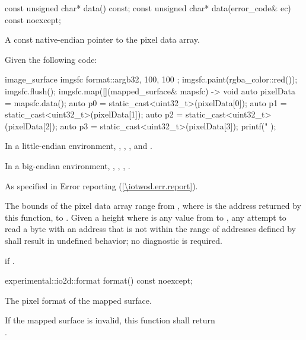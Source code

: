 \begin{itemdecl}
const unsigned char* data() const;
const unsigned char* data(error_code& ec) const noexcept;
\end{itemdecl}
\begin{itemdescr}
\pnum
\returns
A const native-endian pointer to the pixel data array.
\begin{example}
Given the following code:

\begin{codeblock}
image_surface imgsfc{ format::argb32, 100, 100 };
imgsfc.paint(rgba_color::red());
imgsfc.flush();
imgsfc.map([](mapped_surface& mapsfc) -> void {
    auto pixelData = mapsfc.data();
    auto p0 = static_cast<uint32_t>(pixelData[0]);
    auto p1 = static_cast<uint32_t>(pixelData[1]);
    auto p2 = static_cast<uint32_t>(pixelData[2]);
    auto p3 = static_cast<uint32_t>(pixelData[3]);
    printf("%
});
\end{codeblock}

In a little-endian environment, , , , and .

In a big-endian environment, , , , .
\end{example}

\pnum
\throws
As specified in Error reporting (\ref{\iotwod.err.report}).

\pnum
\remarks
The bounds of the pixel data array range from , where  is the address returned by this function, to . Given a height  where  is any value from  to , any attempt to read a byte with an address that is not within the range of addresses defined by  shall result in undefined behavior; no diagnostic is required.

\pnum
\errors
{} if .
\end{itemdescr}

\begin{itemdecl}
experimental::io2d::format format() const noexcept;
\end{itemdecl}
\begin{itemdescr}
\pnum
\returns
The pixel format of the mapped surface.

\pnum
\remarks
If the mapped surface is invalid, this function shall return \\
.
\end{itemdescr}

